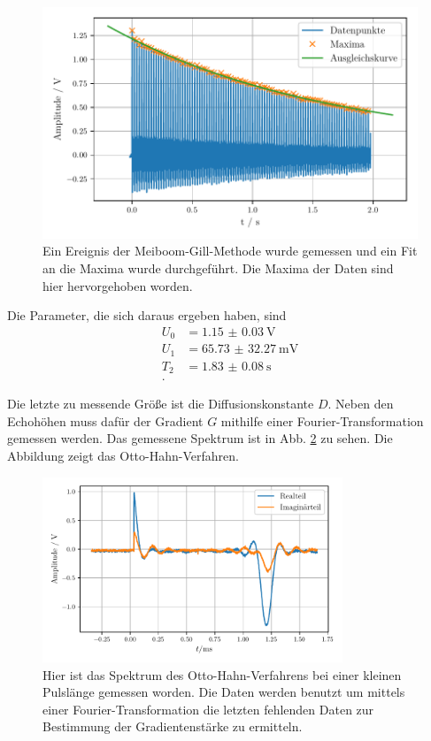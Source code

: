 \begin{figure}
    \centering
    \includegraphics[width=\textwidth]{plots/T2.pdf}
    \caption{Ein Ereignis der Meiboom-Gill-Methode wurde gemessen und ein Fit an die Maxima wurde durchgeführt. Die Maxima der Daten sind hier hervorgehoben worden.}
    \label{abb:t2}
\end{figure}

Die Parameter, die sich daraus ergeben haben, sind 
\begin{align*}
    U_0 &= \SI{1.15(3)}{\volt} \\
    U_1 &= \SI{65.73(3227)}{\milli\volt} \\
    T_2 &= \SI{1.83(8)}{\second} \\.
\end{align*}

Die letzte zu messende Größe ist die Diffusionskonstante $D$. Neben den Echohöhen muss dafür der Gradient $G$ mithilfe einer Fourier-Transformation gemessen werden. 
Das gemessene Spektrum ist in Abb. \ref{abb:spektrum} zu sehen. Die Abbildung zeigt das Otto-Hahn-Verfahren.
\begin{figure}
    \centering
    \includegraphics[width=0.8\textwidth]{plots/spektrum.pdf}
    \caption{Hier ist das Spektrum des Otto-Hahn-Verfahrens bei einer kleinen Pulslänge gemessen worden. Die Daten werden benutzt um mittels einer Fourier-Transformation die letzten fehlenden Daten zur Bestimmung der Gradientenstärke zu ermitteln.}
    \label{abb:spektrum}
\end{figure}

